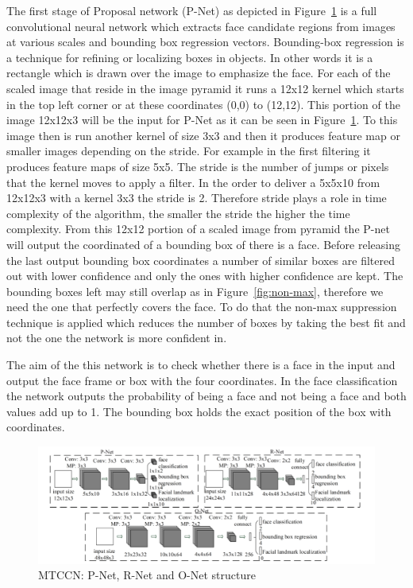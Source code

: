 The first stage of Proposal network (P-Net) as depicted in Figure~\ref{fig:3stages} is a full convolutional neural network which extracts face candidate regions from images at various scales and bounding box regression vectors. Bounding-box regression is a technique for refining or localizing boxes in objects. In other words it is a rectangle which is drawn over the image to emphasize the face. For each of the scaled image that reside in the image pyramid it runs a 12x12 kernel which starts in the top left corner or at these coordinates (0,0) to (12,12). This portion of the image 12x12x3 will be the input for P-Net as it can be seen in Figure~\ref{fig:3stages}. To this image then is run another kernel of size 3x3 and then it produces feature map or smaller images depending on the stride. For example in the first filtering it produces feature maps of size 5x5. The stride is the number of jumps or pixels that the kernel moves to apply a filter. In the order to deliver a 5x5x10 from 12x12x3 with a kernel 3x3 the stride is 2. Therefore stride plays a role in time complexity of the algorithm, the smaller the stride the higher the time complexity. From this 12x12 portion of a scaled image from pyramid the P-net will output the coordinated of a bounding box of there is a face. Before releasing the last output bounding box coordinates a number of similar boxes are filtered out with lower confidence and only the ones with higher confidence are kept. The bounding boxes left may still overlap as in Figure~\ref{fig:non-max}, therefore we need the one that perfectly covers the face. To do that the non-max suppression technique is applied which reduces the number of boxes by taking the best fit and not the one the network is more confident in. 




The aim of the this network is to check whether there is a face in the input and output the face frame or box with the four coordinates. In the face classification the network outputs the probability of being a face and not being a face and both values add up to 1. The bounding box holds the exact position of the box with coordinates. 


\begin{figure}[!htb]
    \centering
    \includegraphics[width=1\textwidth]{figures/3stages.png}
    \caption{ MTCCN: P-Net, R-Net and O-Net structure}
    \label{fig:3stages}
\end{figure}


